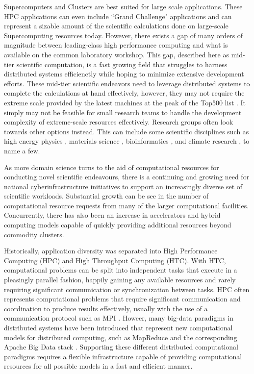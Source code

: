 Supercomputers and Clusters are best suited for large scale applications.  These HPC applications can even include ``Grand Challenge" applications \cite{hoare2005grand} and can represent a sizable amount of the scientific calculations done on large-scale Supercomputing resources today. However, there exists a gap of many orders of magnitude  between leading-class high performance computing and what is available on the common laboratory workshop. This gap, described here as mid-tier scientific computation, is a fast growing field that struggles to harness distributed systems efficienctly while hoping to minimize extensive development efforts. These mid-tier scientific endeavors need to leverage distributed systems to complete the calculations at hand effectively, however, they may not require the extreme scale provided by the latest machines at the peak of the Top500 list \cite{www-top500}. It simply may not be feasible for small research teams to handle the development complexity of extreme-scale resources effectively. Research groups often look towards other options instead.  This can include some scientific disciplines such as high energy physics \cite{buncic2010cernvm}, materials science \cite{wang2006survey}, bioinformatics \cite{menon2012cloud}, and climate research \cite{He2010nasa}, to name a few.  


As more domain science turns to the aid of computational resources for conducting novel scientific endeavours, there is a continuing and growing need for national cyberinfrastructure initiatives to support an increasingly diverse set of scientific workloads. Substantial growth can be see in the number of computational resource requests \cite{towns2014xsede, antypas2008nersc} from many of the larger computational facilities.  Concurrently, there has also been an increase in accelerators and hybrid computing models capable of quickly providing additional resources \cite{vetter2011keeneland} beyond commodity clusters.

Historically, application diversity was separated into High Performance Computing (HPC) and High Throughput Computing (HTC).  With HTC, computational problems can be split into independent tasks that execute in a pleasingly parallel fashion, happily gaining any available resources and rarely requiring significant communication or synchronization between tasks. HPC often represents computational problems that require significant communication and coordination to produce results effectively,  usually with the use of a communication protocol such as MPI \cite{mpi}. Howeer, many big-data paradigms \cite{agrawal2011big} in distributed systems  have been introduced that represent new computational models for distributed computing, such as MapReduce \cite{dean2008mapreduce} and the corresponding Apache Big Data stack \cite{kamburugamuve2013survey, chen2014big}. Supporting these different distributed computational paradigms requires a flexible infrastructure capable of providing computational resources for all possible models in a fast and efficient manner.



